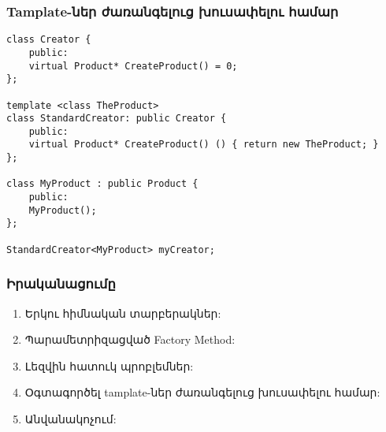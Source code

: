 \documentclass{beamer}
\begin{document}
\begin{frame}[fragile]\frametitle{Tamplate-ներ ժառանգելուց խուսափելու համար}
\begin{english}
\begin{verbatim}
class Creator {
    public:
    virtual Product* CreateProduct() = 0;
};

template <class TheProduct>
class StandardCreator: public Creator {
    public:
    virtual Product* CreateProduct() () { return new TheProduct; }
};

class MyProduct : public Product {
    public:
    MyProduct();
};

StandardCreator<MyProduct> myCreator;
\end{verbatim}
\end{english}
\end{frame}

\begin{frame}\frametitle{Իրականացումը}
\begin{enumerate}
    \item Երկու հիմնական տարբերակներ: \vspace{0.5cm}
    \item Պարամետրիզացված Factory Method: \vspace{0.5cm}
    \item Լեզվին հատուկ պրոբլեմներ: \vspace{0.5cm}
    \item Օգտագործել tamplate-ներ ժառանգելուց խուսափելու համար: \vspace{0.5cm}
    \item Անվանակոչում: \vfill
\end{enumerate}
\end{frame}
\end{document}
